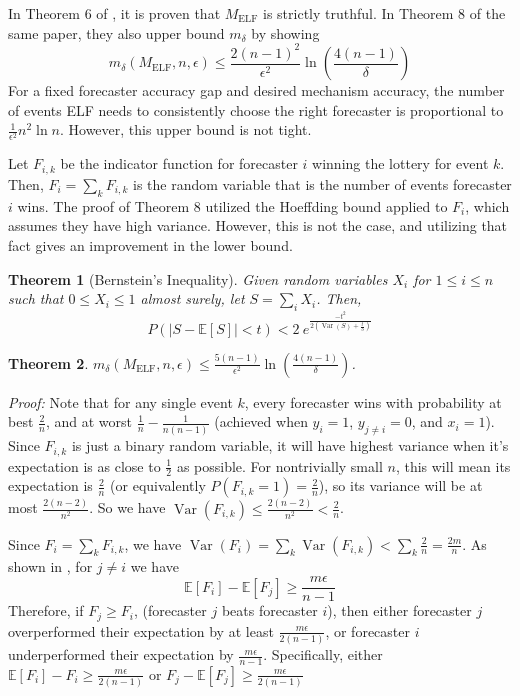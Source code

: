 \documentclass[letterpaper,12pt]{article}
\DeclareMathOperator*{\Var}{Var}
\newcommand{\E}{\mathbb{E}}
\newcommand{\1}{\mathbbm{1}}
\newcommand{\elf}{M_{\mathrm{ELF}}}
\newtheorem{theorem}{Theorem}
\begin{document}
In Theorem 6 of \cite{witkowski2018incentive}, it is proven that $\elf$ is strictly truthful. In Theorem 8 of the same paper, they also upper bound $m_\delta$ by showing 
\[ m_\delta(\elf, n, \epsilon) \leq \frac{2(n-1)^2}{\epsilon^2} \ln \left(\frac{4(n-1)}{\delta}\right)\]
For a fixed forecaster accuracy gap and desired mechanism accuracy, the number of events ELF needs to consistently choose the right forecaster is proportional to $\frac{1}{\epsilon^2} n^2 \ln n$. However, this upper bound is not tight. 

Let $F_{i, k}$ be the indicator function for forecaster $i$ winning the lottery for event $k$. Then, $F_i = \sum_k F_{i, k}$ is the random variable that is the number of events forecaster $i$ wins. The proof of Theorem 8 \cite{witkowski2018incentive} utilized the Hoeffding bound applied to $F_i$, which assumes they have high variance. However, this is not the case, and utilizing that fact gives an improvement in the lower bound. 
\begin{theorem}[Bernstein's Inequality]
  \label{bernstein}
  Given random variables $X_i$ for $1 \leq i \leq n$ such that $0 \leq X_i \leq 1$ almost surely, let $S = \sum_i X_i$. Then,
  \[ P\left(|S - \E[S]| < t\right) < 2 \: e^{\frac{-t^2 }{2\left(\Var(S) + \frac{t}{3}\right)} } \]
\end{theorem}
\begin{theorem}
  \label{elf_bound}
    $m_\delta(\elf, n, \epsilon) \leq \frac{5(n-1)}{\epsilon^2}\ln\left(\frac{4(n-1)}{\delta}\right)$.
\end{theorem}
\emph{Proof:} Note that for any single event $k$, every forecaster wins with probability at best $\frac{2}{n}$, and at worst $\frac{1}{n} - \frac{1}{n(n-1)}$ (achieved when $y_i = 1$, $y_{j\neq i} = 0$, and $x_i = 1$). Since $F_{i, k}$ is just a binary random variable, it will have highest variance when it's expectation is as close to $\frac{1}{2}$ as possible. For nontrivially small $n$, this will mean its expectation is $\frac{2}{n}$ (or equivalently $P(F_{i, k} = 1) = \frac{2}{n}$), so its variance will be at most $\frac{2(n-2)}{n^2}$. So we have $\Var(F_{i, k}) \leq \frac{2(n-2)}{n^2} < \frac{2}{n}$. 

Since $F_i = \sum_k F_{i, k}$, we have $\Var(F_i) = \sum_k \Var(F_{i, k}) < \sum_k \frac{2}{n} = \frac{2m}{n}$. As shown in \citet{witkowski2018incentive}, for $j\neq i$ we have 
\[ \E[F_i] - \E[F_j] \geq \frac{m \epsilon}{n - 1}\]
Therefore, if $F_j \geq F_i$, (forecaster $j$ beats forecaster $i$), then either forecaster $j$ overperformed their expectation by at least $\frac{m \epsilon}{2(n - 1)}$, or forecaster $i$ underperformed their expectation by $\frac{m \epsilon}{n - 1}$. Specifically, either $\E[F_i] - F_i \geq \frac{m \epsilon}{2(n - 1)}$ or $F_j - \E[F_j] \geq \frac{m \epsilon}{2(n - 1)}$
\end{document}
